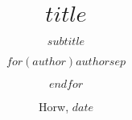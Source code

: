 

\titlehead{\hfill\texttt{[image: bilder/logo-hslu-en-col]} \\ }
\subject{BAUINGENIEURWESEN KONSTRUKTION UND TRAGWERK\\Baudynamik}
\title{$title$}

\subtitle
{$subtitle$}



\date{\large Horw, $date$}
\author{$for(author)$$author$$sep$ \and $endfor$}
